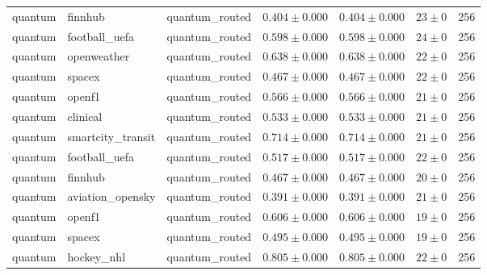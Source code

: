 \begin{table}[htbp]
\begin{tabular}{l l l r r r r}
quantum & finnhub & quantum\_routed & $0.404\pm0.000$ & $0.404\pm0.000$ & $23\pm0$ & 256 \\
quantum & football\_uefa & quantum\_routed & $0.598\pm0.000$ & $0.598\pm0.000$ & $24\pm0$ & 256 \\
quantum & openweather & quantum\_routed & $0.638\pm0.000$ & $0.638\pm0.000$ & $22\pm0$ & 256 \\
quantum & spacex & quantum\_routed & $0.467\pm0.000$ & $0.467\pm0.000$ & $22\pm0$ & 256 \\
quantum & openf1 & quantum\_routed & $0.566\pm0.000$ & $0.566\pm0.000$ & $21\pm0$ & 256 \\
quantum & clinical & quantum\_routed & $0.533\pm0.000$ & $0.533\pm0.000$ & $21\pm0$ & 256 \\
quantum & smartcity\_transit & quantum\_routed & $0.714\pm0.000$ & $0.714\pm0.000$ & $21\pm0$ & 256 \\
quantum & football\_uefa & quantum\_routed & $0.517\pm0.000$ & $0.517\pm0.000$ & $22\pm0$ & 256 \\
quantum & finnhub & quantum\_routed & $0.467\pm0.000$ & $0.467\pm0.000$ & $20\pm0$ & 256 \\
quantum & aviation\_opensky & quantum\_routed & $0.391\pm0.000$ & $0.391\pm0.000$ & $21\pm0$ & 256 \\
quantum & openf1 & quantum\_routed & $0.606\pm0.000$ & $0.606\pm0.000$ & $19\pm0$ & 256 \\
quantum & spacex & quantum\_routed & $0.495\pm0.000$ & $0.495\pm0.000$ & $19\pm0$ & 256 \\
quantum & hockey\_nhl & quantum\_routed & $0.805\pm0.000$ & $0.805\pm0.000$ & $22\pm0$ & 256 \\
\hline
\end{tabular}
\end{table}

